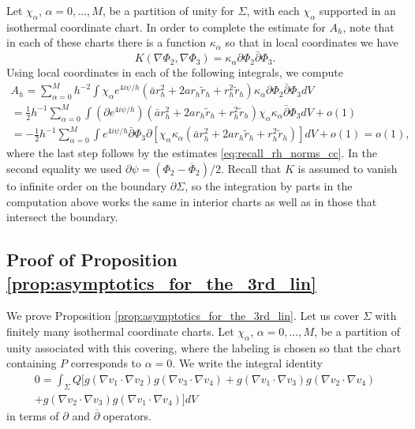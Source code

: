 \documentclass[12pt]{amsart}
\def\p{\partial}
\theoremstyle{definition}
\theoremstyle{remark}
\newcommand{\op}{\overline \p}
\begin{document}
Let $\chi_\alpha$, $\alpha=0,\ldots, M$, be a partition of unity for $\Sigma$, with each $\chi_\alpha$ supported in an isothermal coordinate chart. In order to complete the estimate for $A_h$, note that in each of these charts there is a function $\kappa_\alpha$ so that in local coordinates we have 
\begin{equation*}
K(\nabla\Phi_2,\nabla\Phi_3)=\kappa_\alpha\partial\Phi_2\bar\partial\Phi_3.
\end{equation*}
Using local coordinates in each of the following integrals, we compute
\begin{multline*}
A_h=\sum_{\alpha=0}^Mh^{-2}\int \chi_\alpha e^{4i\psi/h}\left(\bar a r_h^2+2a r_h\tilde r_h+r_h^2\tilde r_h\right)\kappa_\alpha\partial\Phi_2\bar\partial\Phi_3 dV\\
=\frac{1}{2}h^{-1}\sum_{\alpha=0}^M\int\left(\partial e^{4i\psi/h}\right)\left(\bar a r_h^2+2a r_h\tilde r_h+r_h^2\tilde r_h\right)\chi_\alpha\kappa_\alpha\bar\partial\Phi_3 dV+o(1)\\
=-\frac{1}{2}h^{-1}\sum_{\alpha=0}^M\int e^{4i\psi/h}\bar\partial\Phi_3\partial\left[\chi_\alpha\kappa_\alpha \left(\bar a r_h^2+2a r_h\tilde r_h+r_h^2\tilde r_h\right)\right] dV+o(1)=o(1),
\end{multline*}
where the last step follows by the estimates \eqref{eq:recall_rh_norms_cc}. In the second equality we used $\p \psi=(\Phi_2-\overline \Phi_2)/2$. Recall that $K$ is assumed to vanish to infinite order on the boundary $\partial\Sigma$, so the integration by parts in the computation above works the same in interior charts as well as in those that intersect the boundary.













\subsection{Proof of Proposition \ref{prop:asymptotics_for_the_3rd_lin}}
We prove Proposition \ref{prop:asymptotics_for_the_3rd_lin}. Let us cover $\Sigma$ with finitely many isothermal coordinate charts. Let $\chi_\alpha$, $\alpha=0,\ldots, M$, be a partition of unity associated with this covering, where the labeling is chosen so that the chart containing $P$ corresponds to $\alpha=0$. We write the integral identity 
\begin{multline}\label{eq:3rd_ord_integral_identity_proof}
0=\int_{\Sigma}Q\Big[g(\nabla v_1\cdot \nabla v_2)g(\nabla v_3\cdot \nabla  v_4)+g(\nabla v_1\cdot \nabla v_3)g(\nabla v_2\cdot \nabla  v_4) \\
 +g(\nabla v_2\cdot \nabla v_3)g(\nabla v_1\cdot \nabla  v_4)\Big]dV
 \end{multline}
 in terms of $\p$ and $\op$ operators. 
\end{document}
